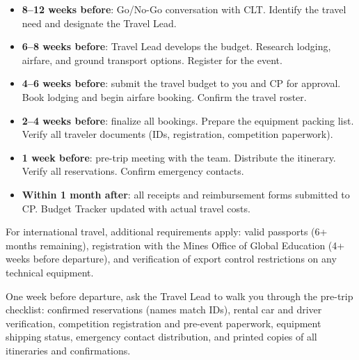 \begin{itemize}[nosep,leftmargin=1.5em]
\item \textbf{8--12 weeks before}: Go/No-Go conversation with CLT. Identify the travel need and designate the Travel Lead.
\item \textbf{6--8 weeks before}: Travel Lead develops the budget. Research lodging, airfare, and ground transport options. Register for the event.
\item \textbf{4--6 weeks before}: submit the travel budget to you and CP for approval. Book lodging and begin airfare booking. Confirm the travel roster.
\item \textbf{2--4 weeks before}: finalize all bookings. Prepare the equipment packing list. Verify all traveler documents (IDs, registration, competition paperwork).
\item \textbf{1 week before}: pre-trip meeting with the team. Distribute the itinerary. Verify all reservations. Confirm emergency contacts.
\item \textbf{Within 1 month after}: all receipts and reimbursement forms submitted to CP. Budget Tracker updated with actual travel costs.
\end{itemize}

For international travel, additional requirements apply: valid passports (6+ months remaining), registration with the Mines Office of Global Education (4+ weeks before departure), and verification of export control restrictions on any technical equipment.

\begin{paaction}
One week before departure, ask the Travel Lead to walk you through the pre-trip checklist: confirmed reservations (names match IDs), rental car and driver verification, competition registration and pre-event paperwork, equipment shipping status, emergency contact distribution, and printed copies of all itineraries and confirmations.
\end{paaction}


